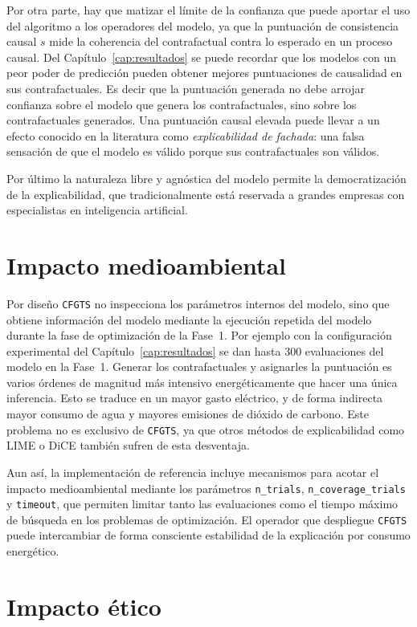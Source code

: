 \documentclass[12pt]{report} %
\begin{document}
Por otra parte, hay que matizar el límite de la confianza que puede aportar el uso del algoritmo a los operadores del modelo, ya que la puntuación de consistencia causal $s$ mide la coherencia del contrafactual contra lo esperado en un proceso causal. Del Capítulo~\ref{cap:resultados} se puede recordar que los modelos con un peor poder de predicción pueden obtener mejores puntuaciones de causalidad en sus contrafactuales. Es decir que la puntuación generada no debe arrojar confianza sobre el modelo que genera los contrafactuales, sino sobre los contrafactuales generados. Una puntuación causal elevada puede llevar a un efecto conocido en la literatura como \textit{explicabilidad de fachada}: una falsa sensación de que el modelo es válido porque sus contrafactuales son válidos.

Por último la naturaleza libre y agnóstica del modelo permite la democratización de la explicabilidad, que tradicionalmente está reservada a grandes empresas con especialistas en inteligencia artificial.

\section{Impacto medioambiental}

Por diseño \texttt{CFGTS} no inspecciona los parámetros internos del modelo, sino que obtiene información del modelo mediante la ejecución repetida del modelo durante la fase de optimización de la Fase~1. Por ejemplo con la configuración experimental del Capítulo~\ref{cap:resultados} se dan hasta 300 evaluaciones del modelo en la Fase~1. Generar los contrafactuales y asignarles la puntuación es varios órdenes de magnitud más intensivo energéticamente que hacer una única inferencia. Esto se traduce en un mayor gasto eléctrico, y de forma indirecta mayor consumo de agua y mayores emisiones de dióxido de carbono. Este problema no es exclusivo de \texttt{CFGTS}, ya que otros métodos de explicabilidad como LIME o DiCE también sufren de esta desventaja.

Aun así, la implementación de referencia incluye mecanismos para acotar el impacto medioambiental mediante los parámetros \texttt{n\_trials}, \texttt{n\_coverage\_trials} y \texttt{timeout}, que permiten limitar tanto las evaluaciones como el tiempo máximo de búsqueda en los problemas de optimización. El operador que despliegue \texttt{CFGTS} puede intercambiar de forma consciente estabilidad de la explicación por consumo energético.

\section{Impacto ético}
\end{document}
